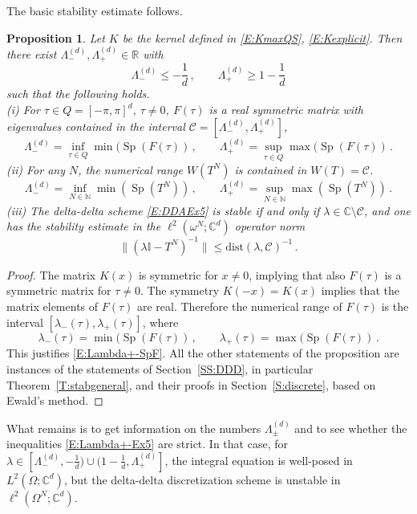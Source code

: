 \documentclass[12pt]{amsart}
\newtheorem{proposition}[theorem]{Proposition}
\theoremstyle{definition}
\theoremstyle{remark}
\numberwithin{equation}{section}
\newcommand\C{{\mathbb C}}
\newcommand\R{{\mathbb R}}
\newcommand\N{{\mathbb N}}
\newcommand\cC{{\mathcal{C}}}
\newcommand {\Id}{\mathbb I}
\newcommand{\dist}{\mathrm{dist}}
\newcommand{\Sp}{\mathop{\mathrm{Sp}}\nolimits}
\begin{document}
The basic stability estimate follows.
\begin{proposition}
 \label{P:W(F)Ex5}
Let $K$ be the kernel defined in \eqref{E:KmaxQS}, \eqref{E:Kexplicit}. Then there exist 
$\Lambda_{-}^{(d)},\Lambda_{+}^{(d)}\in\R$ with 
\begin{equation}
\label{E:Lambda+-Ex5}
\Lambda_{-}^{(d)}\le-\frac1d\,,\qquad \Lambda_{+}^{(d)}\ge 1-\frac1d
\end{equation}
such that the following holds.\\
(i)
For $\tau\in Q=[-\pi,\pi]^{d}$, $\tau\ne0$, $F(\tau)$ is a real symmetric matrix with eigenvalues contained in the interval $\cC=[\Lambda_{-}^{(d)},\Lambda_{+}^{(d)}]$,
\begin{equation}
\label{E:Lambda+-SpF}
\Lambda_{-}^{(d)} = \inf_{\tau\in Q}\min(\Sp(F(\tau))\,,\qquad
\Lambda_{+}^{(d)} = \sup_{\tau\in Q}\max(\Sp(F(\tau))\,.
\end{equation}
(ii) 
For any $N$, the numerical range $W(T^{N})$ is contained in $W(T)=\cC$.\\
\begin{equation}
\label{E:Lambda+-SpT}
\Lambda_{-}^{(d)} = \inf_{N\in\N}\min(\Sp(T^{N}))\,,\qquad
\Lambda_{+}^{(d)} = \sup_{N\in\N}\max(\Sp(T^{N}))\,.
\end{equation}(iii)
The delta-delta scheme \eqref{E:DDAEx5} is stable if and only if $\lambda\in\C\setminus\cC$,
and one has the stability estimate in the $\ell^{2}(\omega^{N};\C^{d})$ operator norm
\begin{equation}
\label{E:ResTNex5}
 \|(\lambda\Id-T^{N})^{-1}\| \le \dist(\lambda,\cC)^{-1}\,.
\end{equation}
\end{proposition}
%
\begin{proof}
The matrix $K(x)$ is symmetric for $x\ne0$, implying that also $F(\tau)$ is a symmetric matrix for $\tau\ne0$. The symmetry $K(-x)=K(x)$ implies that the matrix elements of $F(\tau)$ are real.
Therefore the numerical range of $F(\tau)$ is the interval $[\lambda_{-}(\tau),\lambda_{+}(\tau)]$, where 
$$
  \lambda_{-}(\tau) = \min(\Sp(F(\tau))\,,\qquad
\lambda_{+}(\tau) = \max(\Sp(F(\tau))\,.
$$
This justifies \eqref{E:Lambda+-SpF}.
All the other statements of the proposition are instances of the statements of Section~\ref{SS:DDD}, in particular Theorem~\ref{T:stabgeneral}, and their proofs in Section~\ref{S:discrete}, based on Ewald's method.
\end{proof}
What remains is to get information on the numbers $\Lambda_{\pm}^{(d)}$ and to see whether the inequalities \eqref{E:Lambda+-Ex5} are strict. In that case,
for $\lambda\in[\Lambda_{-}^{(d)},-\frac1d)\cup(1-\frac1d,\Lambda_{+}^{(d)}]$,
the integral equation is well-posed in $L^{2}(\Omega;\C^{d})$, but the delta-delta discretization scheme is unstable in $\ell^{2}(\Omega^{N};\C^{d})$.
\end{document}
